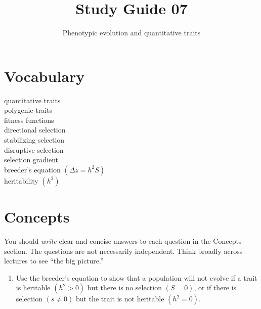 \documentclass[letterpaper]{tufte-handout}
\title{Study Guide 07\hfill}
\author{Phenotypic evolution and quantitative traits}
\date{} %
\begin{document}
\maketitle	%

\section{Vocabulary}

\begin{multicols}{2}
quantitative traits \\
polygenic traits \\
fitness functions \\
directional selection \\
stabilizing selection \\
disruptive selection \\
selection gradient \\
breeder's equation $\left(\Delta z = h^2S\right)$ \\
heritability $\left(h^2\right)$ \\
\end{multicols}


\section{Concepts}

You should \emph{write} clear and concise answers to each question in the Concepts section.  The questions are not necessarily independent.  Think broadly across lectures to see ``the big picture.'' 

\begin{enumerate}
	
	\item Use the breeder's equation to show that a population will not evolve if a trait is heritable $(h^2 > 0)$ but there is no selection $(S = 0)$, or if there is selection $(s \ne 0)$ but the trait is not heritable $(h^2 = 0)$.


\end{enumerate}
\end{document}
